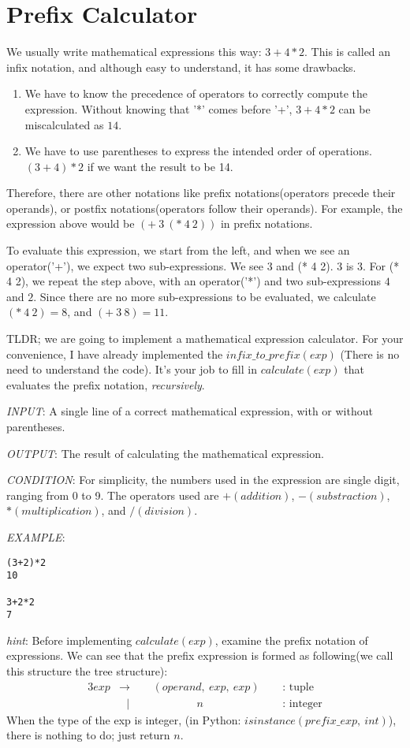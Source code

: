 \documentclass{article}
\begin{document}
\section{Prefix Calculator}
We usually write mathematical expressions this way:
$3+4*2$. This is called an infix notation, and although easy to understand, it has
some drawbacks.
\begin{enumerate}
  \item We have to know the precedence of operators to correctly compute the
    expression. Without knowing that '*' comes before '+', $3+4*2$ can be
    miscalculated as $14$.
  \item We have to use parentheses to express the intended order of operations.
    $(3+4)*2$ if we want the result to be 14.
\end{enumerate}
Therefore, there are other notations like prefix notations(operators precede
their operands), or postfix notations(operators follow their operands).
For example, the expression above would be $(+\ 3\ (*\ 4\
2))$ in prefix notations.

To evaluate this expression, we start from the left, and when we see an
operator('+'), we expect two sub-expressions. We see $3$ and (* 4 2).
3 is 3. For (* 4 2), we repeat the step above, with an operator('*') and
two sub-expressions $4$ and $2$. Since there are no more sub-expressions to be
evaluated, we calculate $(*\ 4\ 2) = 8$, and $(+\ 3\ 8) = 11$.

TLDR; we are going to implement a mathematical expression calculator.
For your convenience, I have already implemented the $infix\_to\_prefix(exp)$
(There is no need to understand the code).
It's your job to fill in $calculate(exp)$ that evaluates the prefix notation,
\textit{recursively}.


\textit{INPUT}: A single line of a correct mathematical expression, with or
without parentheses.

\textit{OUTPUT}: The result of calculating the mathematical expression.

\textit{CONDITION}: For simplicity, the numbers used in the expression are
single digit, ranging from 0 to 9. The operators used are $+(addition)$,
$-(substraction)$, $*(multiplication)$, and $/(division)$.

\textit{EXAMPLE}:
\begin{lstlisting}
(3+2)*2
10

3+2*2
7
\end{lstlisting}

\textit{hint}: Before implementing $calculate(exp)$, examine the prefix notation
of expressions. We can see that the prefix expression is formed as following(we
call this structure the tree structure):
\begin{alignat*}{3}
  exp &\rightarrow \ \  &&(operand,\ exp,\ exp)\ \  &&\text{: tuple}\\
      &\ \ \ | &&\quad\quad\quad\quad n &&\text{: integer}
\end{alignat*}
When the type of the exp is integer, (in Python:
$isinstance(prefix\_exp,\ int)$), there
is nothing to do; just return $n$.
\end{document}
